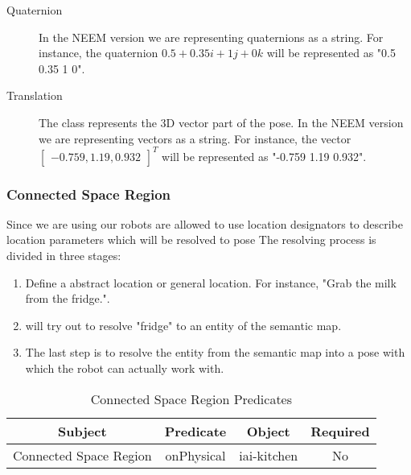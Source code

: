 	\begin{description}
		\item[Quaternion] 
			In the NEEM version \neemversion we are representing quaternions as a string.
			For instance, the quaternion $0.5 + 0.35i + 1j +0k$ will be represented as "0.5 0.35 1 0".
		\item[Translation]
			The  class represents the 3D vector part of the pose.
			In the NEEM version \neemversion we are representing vectors as a string.
			For instance, the vector $\begin{bmatrix} -0.759, 1.19, 0.932 \end{bmatrix}^T$ will be represented as "-0.759 1.19 0.932".
			
			



	\end{description}
	
	
	
\subsubsection{Connected Space Region}
	\label{sec:connectedSpaceRegion}
	Since we are using \cram our robots are allowed to use location designators to describe location parameters which will be resolved to pose \cite{beetz2010cram}
	The resolving process is divided in three stages:
		\begin{enumerate}
			\item Define a abstract location or general location. For instance, "Grab the milk from the fridge.".
			\item \cram will try out to resolve "fridge" to an entity of the semantic map.
			\item The last step is to resolve the entity from the semantic map into a pose with which the robot can actually work with.
		\end{enumerate}
	
	\begin{table}[H]
		\begin{tabular}{| c | c | c | c |}
			\hline			
			\textbf{Subject} & \textbf{Predicate} & \textbf{Object} & \textbf{Required}\\
			\hline
			Connected Space Region & onPhysical & iai-kitchen & No \\
			\hline
		\end{tabular}
		\caption{Connected Space Region Predicates}
		\label{table:connected_space_region_predicates}
	\end{table}
	
